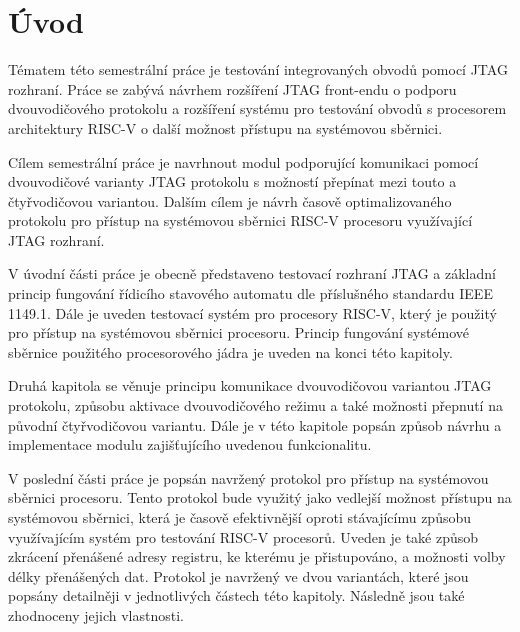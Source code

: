 \chapter*{Úvod}
{}

Tématem této semestrální práce je testování integrovaných obvodů pomocí \acs{JTAG} rozhraní. Práce se zabývá návrhem rozšíření \acs{JTAG} front-endu o podporu dvouvodičového protokolu a rozšíření systému pro testování obvodů s procesorem architektury \acs{RISC-V} o další možnost přístupu na systémovou sběrnici.

Cílem semestrální práce je navrhnout modul podporující komunikaci pomocí dvouvodičové varianty \acs{JTAG} protokolu s možností přepínat mezi touto a čtyřvodičovou variantou. Dalším cílem je návrh časově optimalizovaného protokolu pro přístup na systémovou sběrnici \acs{RISC-V} procesoru využívající \acs{JTAG} rozhraní.

V úvodní části práce je obecně představeno testovací rozhraní \acs{JTAG} a základní princip fungování řídicího stavového automatu dle příslušného standardu IEEE 1149.1. Dále je uveden testovací systém pro procesory \acs{RISC-V}, který je použitý pro přístup na systémovou sběrnici procesoru. Princip fungování systémové sběrnice použitého procesorového jádra je uveden na konci této kapitoly.

Druhá kapitola se věnuje principu komunikace dvouvodičovou variantou \acs{JTAG} protokolu, způsobu aktivace dvouvodičového režimu a také možnosti přepnutí na původní čtyřvodičovou variantu. Dále je v této kapitole popsán způsob návrhu a implementace modulu zajišťujícího uvedenou funkcionalitu.

V poslední části práce je popsán navržený protokol pro přístup na systémovou sběrnici procesoru. Tento protokol bude využitý jako vedlejší možnost přístupu na systémovou sběrnici, která je časově efektivnější oproti stávajícímu způsobu využívajícím systém pro testování \acs{RISC-V} procesorů. Uveden je také způsob zkrácení přenášené adresy registru, ke kterému je přistupováno, a možnosti volby délky přenášených dat. Protokol je navržený ve dvou variantách, které jsou popsány detailněji v jednotlivých částech této kapitoly. Následně jsou také zhodnoceny jejich vlastnosti.

